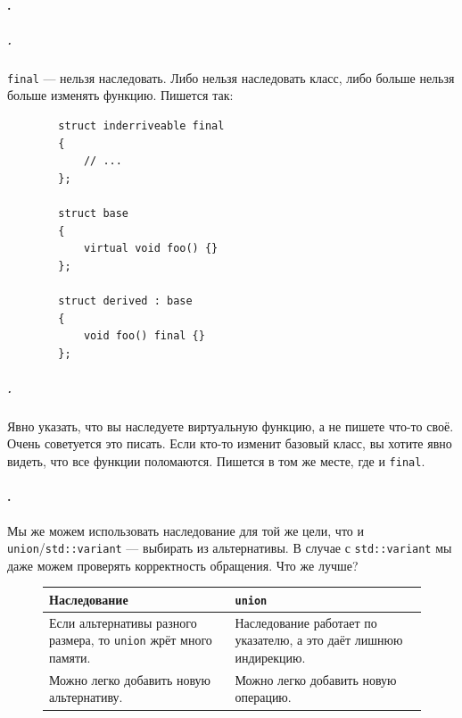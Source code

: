\documentclass{article}
\begin{document}
    \paragraph{.}
    \subparagraph{.}
    \texttt{final} --- нельзя наследовать. Либо нельзя наследовать класс, либо больше нельзя больше изменять функцию. Пишется так:
    \begin{verbatim}
        struct inderriveable final
        {
            // ...
        };

        struct base
        {
            virtual void foo() {}
        };

        struct derived : base
        {
            void foo() final {}
        };
    \end{verbatim}
    \subparagraph{.}
    Явно указать, что вы наследуете виртуальную функцию, а не пишете что-то своё. Очень советуется это писать. Если кто-то изменит базовый класс, вы хотите явно видеть, что все функции поломаются. Пишется в том же месте, где и \texttt{final}.
    \paragraph{.}
    Мы же можем использовать наследование для той же цели, что и \texttt{union}/\texttt{std::variant} --- выбирать из альтернативы. В случае с \texttt{std::variant} мы даже можем проверять корректность обращения. Что же лучше?
    \begin{figure}[H]
        \begin{tabular}{|m{}|m{}|}
            \hline
            Наследование & \texttt{union}\\
            \hline
            Если альтернативы разного размера, то \texttt{union} жрёт много памяти. & Наследование работает по указателю, а это даёт лишнюю индирекцию.\\
            \hline
            Можно легко добавить новую альтернативу. & Можно легко добавить новую операцию.\\
            \hline
        \end{tabular}
    \end{figure}
\end{document}
